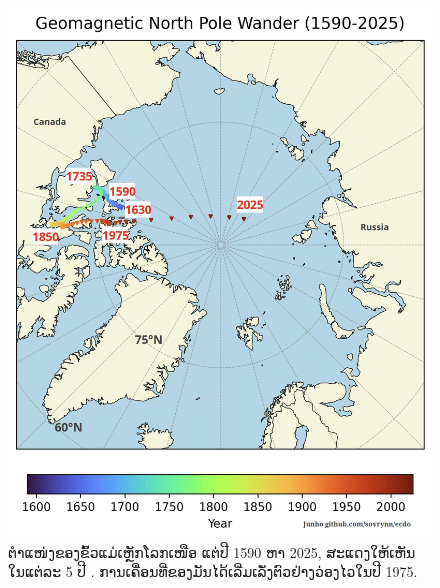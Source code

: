 \documentclass[10pt,twocolumn,letterpaper]{article}
\begin{document}
\begin{figure}[t]
\begin{center}
   \includegraphics[width=1\linewidth]{npw.jpg}
\end{center}
   \caption{ຕໍາແໜ່ງຂອງຂົ້ວແມ່ເຫຼັກໂລກເໜືອ ແຕ່ປີ 1590 ຫາ 2025, ສະແດງໃຫ້ເຫັນໃນແຕ່ລະ 5 ປີ \cite{41}.
ການເຄື່ອນທີ່ຂອງມັນໄດ້ເລີ່ມເລັ່ງຕົວຢ່າງວ່ອງໄວໃນປີ 1975. \cite{175}}
\label{fig:13}
\label{fig:onecol}
\end{figure}
\end{document}

